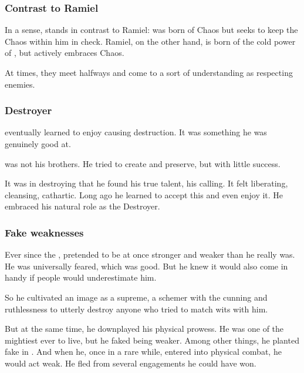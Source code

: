 \subsubsection{Contrast to Ramiel}
In a sense, \Ishnaruchaefir{} stands in contrast to Ramiel: 
\Ishnaruchaefir{} was born of Chaos but seeks to keep the Chaos within him in check. 
Ramiel, on the other hand, is born of the cold power of \Erebos, but actively embraces Chaos.

At times, they meet halfways and come to a sort of understanding as respecting enemies.





\subsubsection{Destroyer}
\Ishnaruchaefir eventually learned to enjoy causing destruction. 
It was something he was genuinely good at.
 
\Ishnaruchaefir was not his brothers. 
He tried to create and preserve, but with little success. 

It was in destroying that he found his true talent, his calling. 
It felt liberating, cleansing, cathartic. 
Long ago he learned to accept this and even enjoy it. 
He embraced his natural role as the Destroyer. 





\subsubsection{Fake weaknesses}
Ever since the \secondbanewar, \Ishnaruchaefir{} pretended to be at once stronger and weaker than he really was. 
He was universally feared, which was good. 
But he knew it would also come in handy if people would underestimate him. 

So he cultivated an image as a  supreme, a schemer with the cunning and ruthlessness to utterly destroy anyone who tried to match wits with him. 

But at the same time, he downplayed his physical prowess. 
He was one of the mightiest \dragons{} ever to live, but he faked being weaker. 
Among other things, he planted fake  in \emph{}. 
And when he, once in a rare while, entered into physical combat, he would act weak. 
He fled from several engagements he could have won. 

